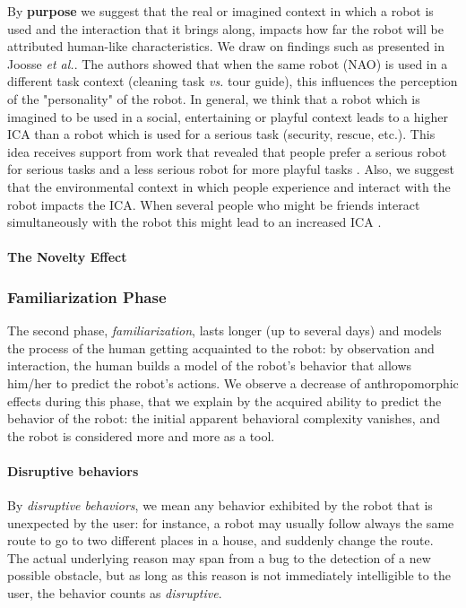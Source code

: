 \documentclass{acm_proc_article-sp}
\begin{document}
By \textbf{purpose} we suggest that the real or imagined context in which a
robot is used and the interaction that it brings along, impacts how far the
robot will be attributed human-like characteristics. We draw on findings such
as presented in Joosse \textit{et al.}. The authors showed
that when the same robot (NAO) is used in a different task context (cleaning
task \textit{vs.} tour guide), this influences the perception of the
"personality" of the robot. In general, we think that a robot which is imagined
to be used in a social, entertaining or playful context leads to a higher ICA
than a robot which is used for a serious task (security, rescue, etc.). This
idea receives support from  work that revealed
that people prefer a serious robot for serious tasks and a less serious robot
for more playful tasks . Also, we suggest that the environmental
context in which people experience and interact with the robot impacts the ICA.
When several people who might be friends interact simultaneously with the robot
this might lead to an increased ICA .

\paragraph{The Novelty Effect}
\label{sec:noveltyeffect}

\subsubsection{Familiarization Phase}
\label{sec:familiarization}

The second phase, \emph{familiarization}, lasts longer (up to several days) and
models the process of the human getting acquainted to the robot: by observation
and interaction, the human builds a model of the robot's behavior that allows
him/her to predict the robot's actions. We observe a decrease of
anthropomorphic effects during this phase, that we explain by the acquired
ability to predict the behavior of the robot: the initial apparent behavioral
complexity vanishes, and the robot is considered more and more as a tool.

\paragraph{Disruptive behaviors}

By \emph{disruptive behaviors}, we mean any behavior exhibited by the robot
that is unexpected by the user: for instance, a robot may usually follow always
the same route to go to two different places in a house, and suddenly change
the route. The actual underlying reason may span from a bug to the detection of
a new possible obstacle, but as long as this reason is not immediately
intelligible to the user, the behavior counts as \emph{disruptive}.
\end{document}
